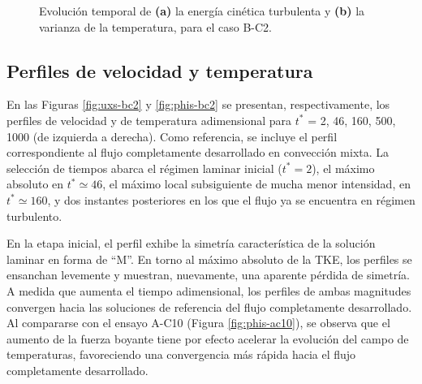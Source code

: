 \begin{figure}[H]
  \centering  
    
  \caption{Evolución temporal de \textbf{(a)} la energía cinética turbulenta y \textbf{(b)} la varianza de la temperatura, para el caso B-C2.}
  \label{fig:bc2-2}
\end{figure}

\subsection{Perfiles de velocidad y temperatura}
En las Figuras \ref{fig:uxs-bc2} y \ref{fig:phis-bc2} se presentan, respectivamente, los perfiles de velocidad y de temperatura adimensional para $t^*$ = 2, 46, 160, 500, 1000 (de izquierda a derecha). Como referencia, se incluye el perfil correspondiente al flujo completamente desarrollado en convección mixta. La selección de tiempos abarca el régimen laminar inicial ($t^* = 2$), el máximo absoluto en $t^* \simeq 46$, el máximo local subsiguiente de mucha menor intensidad, en $t^* \simeq 160$, y dos instantes posteriores en los que el flujo ya se encuentra en régimen turbulento.

En la etapa inicial, el perfil exhibe la simetría característica de la solución laminar en forma de ``M''. En torno al máximo absoluto de la TKE, los perfiles se ensanchan levemente y muestran, nuevamente, una aparente pérdida de simetría. A medida que aumenta el tiempo adimensional, los perfiles de ambas magnitudes convergen hacia las soluciones de referencia del flujo completamente desarrollado. Al compararse con el ensayo A-C10 (Figura \ref{fig:phis-ac10}), se observa que el aumento de la fuerza boyante tiene por efecto acelerar la evolución del campo de temperaturas, favoreciendo una convergencia más rápida hacia el flujo completamente desarrollado.


